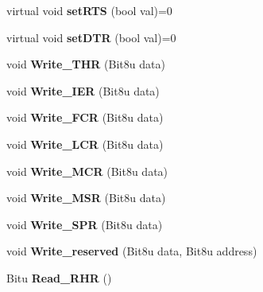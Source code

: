 \begin{DoxyCompactItemize}
\item 
\hypertarget{classCSerial_a3ad85c5e6fe53d4934eebff8234226f3}{virtual void {\bfseries set\-R\-T\-S} (bool val)=0}\label{classCSerial_a3ad85c5e6fe53d4934eebff8234226f3}

\item 
\hypertarget{classCSerial_ae633ef093a4cd8b82c373f2768896f78}{virtual void {\bfseries set\-D\-T\-R} (bool val)=0}\label{classCSerial_ae633ef093a4cd8b82c373f2768896f78}

\item 
\hypertarget{classCSerial_a8e7597eb951ddc04d0778765ae9fd05f}{void {\bfseries Write\-\_\-\-T\-H\-R} (Bit8u data)}\label{classCSerial_a8e7597eb951ddc04d0778765ae9fd05f}

\item 
\hypertarget{classCSerial_ade69b9fe0ccc79ab266b11ab32872dd8}{void {\bfseries Write\-\_\-\-I\-E\-R} (Bit8u data)}\label{classCSerial_ade69b9fe0ccc79ab266b11ab32872dd8}

\item 
\hypertarget{classCSerial_a9eb41bc2d20464ce68e22579b47f291d}{void {\bfseries Write\-\_\-\-F\-C\-R} (Bit8u data)}\label{classCSerial_a9eb41bc2d20464ce68e22579b47f291d}

\item 
\hypertarget{classCSerial_a28616544f272ab054298621561447924}{void {\bfseries Write\-\_\-\-L\-C\-R} (Bit8u data)}\label{classCSerial_a28616544f272ab054298621561447924}

\item 
\hypertarget{classCSerial_a4f95a3cccb9403edb4947e6de6101346}{void {\bfseries Write\-\_\-\-M\-C\-R} (Bit8u data)}\label{classCSerial_a4f95a3cccb9403edb4947e6de6101346}

\item 
\hypertarget{classCSerial_a332d706f5979eb07dfb8e4ada29e7dfa}{void {\bfseries Write\-\_\-\-M\-S\-R} (Bit8u data)}\label{classCSerial_a332d706f5979eb07dfb8e4ada29e7dfa}

\item 
\hypertarget{classCSerial_ae27c570b7bcd4c5ac6e0f4c4a5ff2045}{void {\bfseries Write\-\_\-\-S\-P\-R} (Bit8u data)}\label{classCSerial_ae27c570b7bcd4c5ac6e0f4c4a5ff2045}

\item 
\hypertarget{classCSerial_a28e4f958e7b7edc46a295d2fe5c7dbc8}{void {\bfseries Write\-\_\-reserved} (Bit8u data, Bit8u address)}\label{classCSerial_a28e4f958e7b7edc46a295d2fe5c7dbc8}

\item 
\hypertarget{classCSerial_ade498e8c549ed48e8001bcfce6771fe0}{Bitu {\bfseries Read\-\_\-\-R\-H\-R} ()}\label{classCSerial_ade498e8c549ed48e8001bcfce6771fe0}


\end{DoxyCompactItemize}
